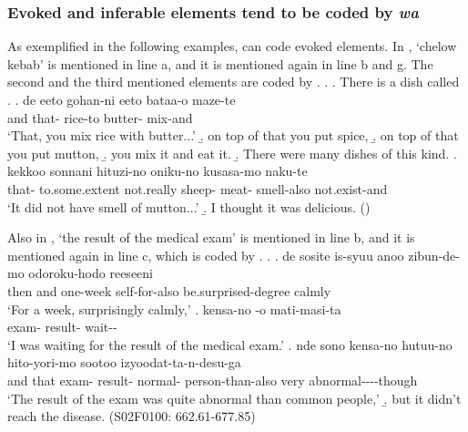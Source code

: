 \subsubsection{Evoked and inferable elements tend to be coded by \textit{wa}}

As exemplified in the following examples,
 can code evoked elements.
In \Next,
`chelow kebab' is mentioned in line a,
and it is mentioned again in line b and g.
The second and the third mentioned elements are coded by .
%
\ex.\label{kebab}
 \a. There is a dish called .
 \bg. de  eeto gohan-ni eeto bataa-o maze-te \\
 	and that-  rice-to  butter- mix-and \\
	`That, you mix rice with butter...'
 \b. on top of that you put spice,
 \b. on top of that you put mutton,
 \b. you mix it and eat it.
 \b. There were many dishes of this kind.
 \bg.  kekkoo sonnani hituzi-no oniku-no kusasa-mo naku-te \\
 	that- to.some.extent not.really sheep- meat- smell-also not.exist-and \\
	`It did not have smell of mutton...'
 \b. I thought it was delicious.
 \hfill{()}

Also in \Next,
`the result of the medical exam' is mentioned in line b,
and it is mentioned again in line c, which is coded by .
%
\ex.\label{kensakekka}
 \ag. de sosite is-syuu anoo zibun-de-mo odoroku-hodo reeseeni \\
 	then and one-week  self-for-also be.surprised-degree calmly \\
	`For a week, surprisingly calmly,'
 \bg. kensa-no -o mati-masi-ta \\
 	exam- result- wait-- \\
	`I was waiting for the result of the medical exam.'
 \bg. nde sono kensa-no  hutuu-no hito-yori-mo sootoo izyoodat-ta-n-desu-ga \\
 	and that exam- result- normal- person-than-also very abnormal----though \\
 	`The result of the exam was quite abnormal than common people,'
 \b. but it didn't reach the disease.
 \hfill{(S02F0100: 662.61-677.85)}


